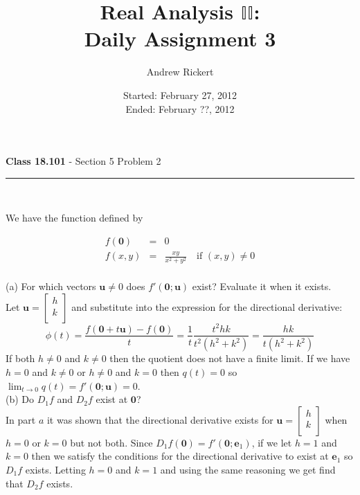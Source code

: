 \documentclass[11pt,reqno]{article}
\title{Real Analysis $\mathbb{II}$: \\ Daily Assignment 3}
\author{Andrew Rickert}
\date{Started: February 27, 2012 \\ \hspace{1pt} Ended: February ??,  2012}                                           %
\begin{document}
\maketitle


\begin{flushleft} 
\textbf{Class 18.101} - Section 5 Problem 2\\
\rule{500pt}{1pt}\\
\end{flushleft} 

We have the function defined by

\begin{eqnarray*} 
f(\textbf{0}) &=& 0 \\
f(x,y) &=& \frac{x y}{x^2 + y^2} \quad \text{if $(x,y) \neq 0$} \\
\end{eqnarray*}

\noindent (a) For which vectors $\textbf{u} \neq 0$ does $f'(\textbf{0};\textbf{u})$ exist? Evaluate it when it exists.\\

Let $\textbf{u} = \left[ \begin{array}{c} h\\ k\\ \end{array} \right]$ and substitute into the expression for the directional derivative:
\[ \phi(t) = \frac{f(\textbf{0} + t \textbf{u}) - f(\textbf{0})}{t} = \frac{1}{t} \frac{t^2 h k}{t^2 (h^2 + k^2)} = \frac{h k}{t (h^2 + k^2)} \]
If both $h \neq 0$ and $k \neq 0$ then the quotient does not have a finite limit. If we have $h = 0$ and $k \neq 0$ or $h \neq 0$ and $k = 0$ then $q(t) = 0$ so $\lim_{t \to 0} q(t) = f'(\textbf{0};\textbf{u}) = 0$.\\

\noindent (b) Do $D_1 f$ and $D_2 f$ exist at $\textbf{0}$?\\

In part $a$ it was shown that the directional derivative exists for $\textbf{u} = \left[ \begin{array}{c} h\\ k\\ \end{array} \right]$ when $h = 0$ or $k = 0$ but not both. Since $D_1 f(\textbf{0}) = f'(\textbf{0};\textbf{e}_1)$, if we let $h = 1$ and $k = 0$ then we satisfy the conditions for the directional derivative to exist at $\textbf{e}_1$ so $D_1 f$ exists. Letting $h = 0$ and $k = 1$ and using the same reasoning we get find that $D_2 f$ exists.\\
\end{document}
